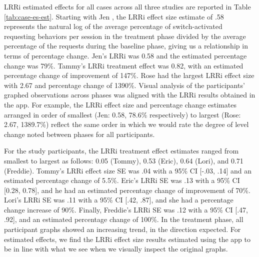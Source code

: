 \documentclass[
]{book}
\begin{document}
LRRi estimated effects for all cases across all three studies are reported in Table \ref{tab:case-es-est}. Starting with Jen \citep{Byiers2014}, the LRRi effect size estimate of .58 represents the natural log of the average percentage of switch-activated requesting behaviors per session in the treatment phase divided by the average percentage of the requests during the baseline phase, giving us a relationship in terms of percentage change. Jen's LRRi was 0.58 and the estimated percentage change was 79\%. Tammy's LRRi treatment effect was 0.82, with an estimated percentage change of improvement of 147\%. Rose had the largest LRRi effect size with 2.67 and percentage change of 1390\%. Visual analysis of the participants' graphed observations across phases was aligned with the LRRi results obtained in the app. For example, the LRRi effect size and percentage change estimates arranged in order of smallest (Jen: 0.58, 78.6\% respectively) to largest (Rose: 2.67, 1389.7\%) reflect the same order in which we would rate the degree of level change noted between phases for all participants.

For the \citet{Casey1978} study participants, the LRRi treatment effect estimates ranged from smallest to largest as follows: 0.05 (Tommy), 0.53 (Eric), 0.64 (Lori), and 0.71 (Freddie). Tommy's LRRi effect size SE was .04 with a 95\% CI {[}-.03, .14{]} and an estimated percentage change of 5.5\%. Eric's LRRi SE was .13 with a 95\% CI {[}0.28, 0.78{]}, and he had an estimated percentage change of improvement of 70\%. Lori's LRRi SE was .11 with a 95\% CI {[}.42, .87{]}, and she had a percentage change increase of 90\%. Finally, Freddie's LRRi SE was .12 with a 95\% CI {[}.47, .92{]}, and an estimated percentage change of 100\%. In the treatment phase, all participant graphs showed an increasing trend, in the direction expected. For \citet{Casey1978} estimated effects, we find the LRRi effect size results estimated using the app to be in line with what we see when we visually inspect the original graphs.
\end{document}
